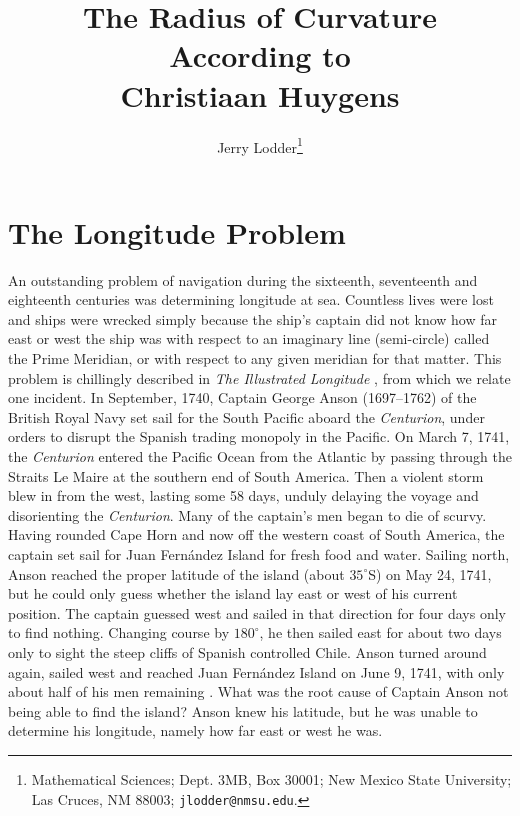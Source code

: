 \documentclass[12pt]{article}
\theoremstyle{definition}
\begin{document}
\title{The Radius of Curvature According to \\
Christiaan Huygens}
\author{Jerry Lodder\thanks{Mathematical Sciences; 
Dept. 3MB, Box 30001; New Mexico State University; 
Las Cruces, NM 88003; \texttt{jlodder@nmsu.edu}.}}
\maketitle 

\section{The Longitude Problem}

An outstanding problem of navigation during the sixteenth,
seventeenth and eighteenth centuries was determining longitude at sea.
Countless lives were lost and ships were wrecked simply because the
ship's captain did not know how far east or west the ship was with
respect to an imaginary line (semi-circle) called the Prime Meridian, or with
respect to any given meridian for that matter.  This problem
is chillingly described in {\em The Illustrated Longitude}
\cite{Sobel}, from which we relate one incident.
In September, 1740, Captain George Anson (1697--1762) of the British
Royal Navy set sail for the South Pacific aboard the {\em Centurion},
under orders to disrupt the Spanish trading monopoly in the Pacific.
On March 7, 1741, the {\em Centurion} entered the Pacific Ocean from
the Atlantic by passing through the Straits Le Maire at the southern
end of South America.  Then a violent storm blew in from the west,
lasting some 58 days, unduly delaying the voyage and disorienting 
the {\em Centurion}.  Many of the
captain's men began to die of scurvy.  Having rounded Cape Horn and
now off the western coast of South America, the captain set sail for
Juan Fern\'andez Island for fresh food and water.  Sailing north,
Anson reached the proper latitude of the island (about $35^{\circ}$S)
on May 24, 1741, but he could only guess whether the island lay east
or west of his current position.  The captain guessed west and sailed
in that direction for four days only to find nothing.  Changing course
by $180^{\circ}$, he then sailed east for about two days only to sight 
the steep cliffs of Spanish controlled Chile.  Anson turned around again,
sailed west and reached Juan Fern\'andez Island on June 9, 1741, with
only about half of his men remaining \cite[pp. 21--25]{Sobel}.  
What was the root cause of
Captain Anson not being able to find the island?  Anson knew his
latitude, but he was unable to determine his longitude, namely how far
east or west he was. 
\end{document}
